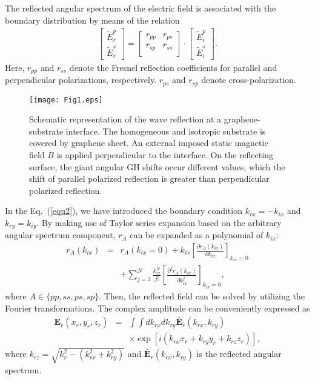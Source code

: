 \documentclass[twocolumn,showpacs,preprintnumbers,amsmath,amssymb]{revtex4}
\begin{document}
The reflected angular spectrum of the electric field is associated
with the boundary distribution by means of the relation~\cite{Luo2011}
\begin{eqnarray}
\left[\begin{array}{cc}
\tilde{E}_r^p\\
\tilde{E}_r^s
\end{array}\right]
=  \left[
  \begin{array}{cc}
    r_{pp} & r_{ps} \\
    r_{sp} & r_{ss} \\
  \end{array}
\right]\cdot\left[\begin{array}{cc}
\tilde{E}_i^p\\
\tilde{E}_i^s
\end{array}\right]\label{equ2}.
\end{eqnarray}
Here, $r_{pp}$ and $r_{ss}$ denote the Fresnel reflection coefficients
for parallel and perpendicular polarizations, respectively.
$r_{ps}$ and $r_{sp}$ denote cross-polarization.

\begin{figure}
\centerline{\texttt{[image: Fig1.eps]}}
\caption{\label{Fig1} Schematic representation of the
wave reflection at a graphene-substrate interface. The homogeneous and isotropic substrate
is covered by graphene sheet. An external imposed
static magnetic field $B$ is applied perpendicular
to the interface. On the reflecting surface,
the giant angular GH shifts occur different values, which the shift of
parallel polarized reflection is greater than perpendicular
polarized reflection.}
\end{figure}

In the Eq.~(\ref{equ2}), we have introduced the boundary condition
$k_{rx}=-k_{ix}$ and $k_{ry}= k_{iy}$. By making use of Taylor
series expansion based on the arbitrary angular spectrum component,
$r_{A}$ can be expanded as a polynomial of $k_{ix}$:
\begin{eqnarray}
r_{A}(k_{ix})&=&r_{A}(k_{ix}=0)+k_{ix}\left[\frac{\partial
r_{A}(k_{ix})}{\partial
k_{ix}}\right]_{k_{ix}=0}\nonumber\\
&&+\sum_{j=2}^{N}\frac{k_{ix}^N}{j!}\left[\frac{\partial^j
r_{A}(k_{ix})}{\partial k_{ix}^j}\right]_{k_{ix}=0}\label{Tarloy},
\end{eqnarray}
where $A\in\{pp,ss,ps,sp\}$.
Then, the reflected field can be solved by utilizing the
Fourier transformations. The complex amplitude
can be conveniently expressed as
\begin{eqnarray}
\mathbf{E}_r(x_r,y_r,z_r )&=&\int\int d k_{rx}dk_{ry}
\tilde{\mathbf{E}_r}(k_{rx},k_{ry})\nonumber\\
&&\times\exp [i(k_{rx}x_r+k_{ry}y_r+ k_{rz} z_r)],\label{equ5}
\end{eqnarray}
where $k_{rz}=\sqrt{k_r^2-(k_{rx}^2+k_{ry}^2)}$ and
$\tilde{\mathbf{E}_r}(k_{rx},k_{ry})$ is the reflected angular
spectrum.
\end{document}
